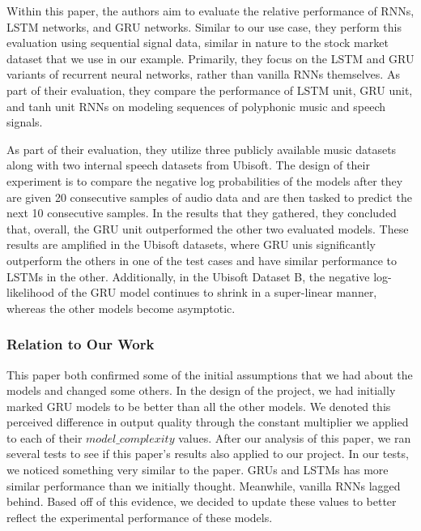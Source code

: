 \documentclass{article}
\begin{document}
    Within this paper, the authors aim to evaluate the relative performance of RNNs, LSTM networks, and GRU networks.
    Similar to our use case, they perform this evaluation using sequential signal data, similar in nature to the
    stock market dataset that we use in our example.  Primarily, they focus on the LSTM and GRU variants of
    recurrent neural networks, rather than vanilla RNNs themselves.  As part of their evaluation, they compare
    the performance of LSTM unit, GRU unit, and tanh unit RNNs on modeling sequences of polyphonic music and
    speech signals.

    As part of their evaluation, they utilize three publicly available music datasets along with two internal speech
    datasets from Ubisoft.  The design of their experiment is to compare the negative log probabilities of the models
    after they are given 20 consecutive samples of audio data and are then tasked to predict the next 10 consecutive
    samples.  In the results that they gathered, they concluded that, overall, the GRU unit outperformed the other
    two evaluated models.  These results are amplified in the Ubisoft datasets, where GRU unis significantly
    outperform the others in one of the test cases and have similar performance to LSTMs in the other.  Additionally,
    in the Ubisoft Dataset B, the negative log-likelihood of the GRU model continues to shrink in a super-linear manner,
    whereas the other models become asymptotic.

    \subsubsection*{Relation to Our Work}

    This paper both confirmed some of the initial assumptions that we had about the models and changed some others.
    In the design of the project, we had initially marked GRU models to be better than all the other models.
    We denoted this perceived difference in output quality through the constant multiplier we applied to each of their
    $model\_complexity$ values.  After our analysis of this paper, we ran several tests to see if this paper's results
    also applied to our project.  In our tests, we noticed something very similar to the paper.  GRUs and LSTMs
    has more similar performance than we initially thought.  Meanwhile, vanilla RNNs lagged behind.  Based off of
    this evidence, we decided to update these values to better reflect the experimental performance of these models.
\end{document}
